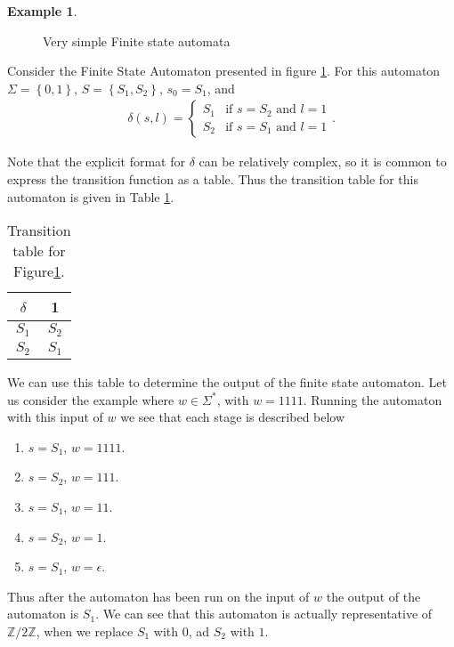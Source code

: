 \documentclass[10pt]{amsart}
\theoremstyle{definition}
\newtheorem*{iexample}{Example}
\theoremstyle{remark}
\newenvironment{example}{\begin{center}\begin{minipage}{0.9\textwidth}\begin{iexample}}{\end{iexample}\end{minipage}\end{center}}
\newcommand{\Z}{\mathbb{Z}}
\begin{document}
\begin{example}
\begin{figure}[htpb]
  \begin{center}
  \end{center}
  \caption{Very simple Finite state automata}%
  \label{fig:auto_ex}
\end{figure}

Consider the Finite State Automaton presented in figure \ref{fig:auto_ex}. For
this automaton $\Sigma=\left\{0, 1\right\}$, $S=\left\{S_1,S_2\right\}$,
$s_0=S_1$, and
\begin{align*}
  \delta(s, l) = \begin{cases}
    S_1 & \text{if }s=S_2\text{ and }l=1\\
    S_2 & \text{if }s=S_1\text{ and }l=1
  \end{cases}.
\end{align*}

Note that the explicit format for $\delta$ can be relatively complex, so it is
common to express the transition function as a table. Thus the transition table
for this automaton is given in Table \ref{tab:auto_ex}.

\begin{table}[htpb]
  \centering
  \caption{Transition table for Figure\ref{fig:auto_ex}.}\label{tab:auto_ex}
  \begin{tabular}{c||c}
    $\delta$ & 1\\
    \hline\hline
    $S_1$ & $S_2$\\
    \hline
    $S_2$ & $S_1$\\
  \end{tabular}
\end{table}

We can use this table to determine the output of the finite state automaton.
Let us consider the example where $w\in\Sigma^*$, with $w=1111$. Running the
automaton with this input of $w$ we see that each stage is described below
\begin{multicols}{2}
  \begin{enumerate}
    \item $s=S_1$, $w=1111$.
    \item $s=S_2$, $w=111$.
    \item $s=S_1$, $w=11$.
    \item $s=S_2$, $w=1$.
    \item $s=S_1$, $w=\epsilon$.
  \end{enumerate}
\end{multicols}

Thus after the automaton has been run on the input of $w$ the output of the
automaton is $S_1$. We can see that this automaton is actually representative
of $\Z/2\Z$, when we replace $S_1$ with $0$, ad $S_2$ with $1$.
\end{example}
\end{document}
